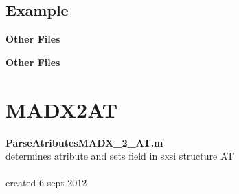 \documentclass[a4paper,12pt]{report}
\begin{document}
\section{Example}
{\bf  Other Files}


{\bf  Other Files}


\chapter{MADX2AT}

{\bf ParseAtributesMADX\_2\_AT.m}\\
  determines atribute and sets field in sxs{i} structure AT\\
 \\
  created 6-sept-2012\\
\\
\end{document}
